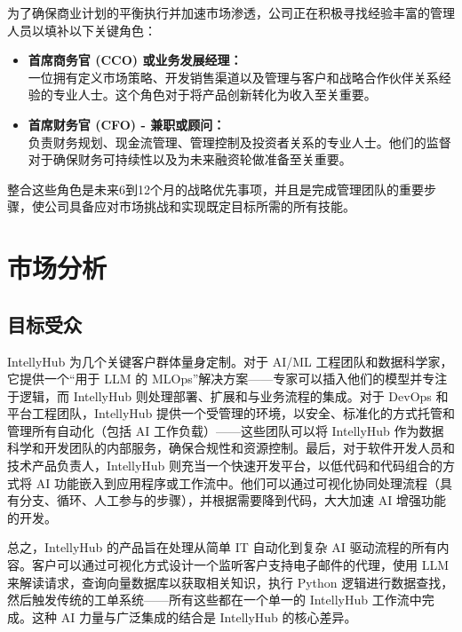 \documentclass[11pt, a4paper, oneside]{article}
\begin{document}
为了确保商业计划的平衡执行并加速市场渗透，公司正在积极寻找经验丰富的管理人员以填补以下关键角色：

\begin{itemize}
    \item \textbf{首席商务官 (CCO) 或业务发展经理：} \\
    一位拥有定义市场策略、开发销售渠道以及管理与客户和战略合作伙伴关系经验的专业人士。这个角色对于将产品创新转化为收入至关重要。

    \item \textbf{首席财务官 (CFO) - 兼职或顾问：} \\
    负责财务规划、现金流管理、管理控制及投资者关系的专业人士。他们的监督对于确保财务可持续性以及为未来融资轮做准备至关重要。
\end{itemize}

整合这些角色是未来6到12个月的战略优先事项，并且是完成管理团队的重要步骤，使公司具备应对市场挑战和实现既定目标所需的所有技能。

\section{市场分析}
\subsection{目标受众}
IntellyHub 为几个关键客户群体量身定制。对于 AI/ML 工程团队和数据科学家，它提供一个“用于 LLM 的 MLOps”解决方案——专家可以插入他们的模型并专注于逻辑，而 IntellyHub 则处理部署、扩展和与业务流程的集成。对于 DevOps 和平台工程团队，IntellyHub 提供一个受管理的环境，以安全、标准化的方式托管和管理所有自动化（包括 AI 工作负载）——这些团队可以将 IntellyHub 作为数据科学和开发团队的内部服务，确保合规性和资源控制。最后，对于软件开发人员和技术产品负责人，IntellyHub 则充当一个快速开发平台，以低代码和代码组合的方式将 AI 功能嵌入到应用程序或工作流中。他们可以通过可视化协同处理流程（具有分支、循环、人工参与的步骤），并根据需要降到代码，大大加速 AI 增强功能的开发。

总之，IntellyHub 的产品旨在处理从简单 IT 自动化到复杂 AI 驱动流程的所有内容。客户可以通过可视化方式设计一个监听客户支持电子邮件的代理，使用 LLM 来解读请求，查询向量数据库以获取相关知识，执行 Python 逻辑进行数据查找，然后触发传统的工单系统——所有这些都在一个单一的 IntellyHub 工作流中完成。这种 AI 力量与广泛集成的结合是 IntellyHub 的核心差异。
\end{document}

